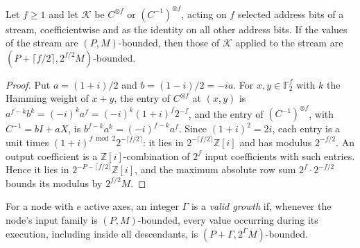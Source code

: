 \begin{lemma}\label{lem:guard-kernels}
Let $f\ge1$ and let $\mathcal K$ be $C^{\otimes f}$ or
$(C^{-1})^{\otimes f}$, acting on $f$ selected address bits of a stream,
coefficientwise and as the identity on all other address bits. If the values
of the stream are $(P,M)$-bounded, then those of $\mathcal K$ applied to the
stream are $(P+\lceil f/2\rceil,2^{f/2}M)$-bounded.
\end{lemma}
\begin{proof}
Put $a=(1+i)/2$ and $b=(1-i)/2=-ia$. For $x,y\in\mathbb F_2^f$ with $k$ the
Hamming weight of $x+y$, the entry of $C^{\otimes f}$ at $(x,y)$ is
$a^{f-k}b^k=(-i)^ka^f=(-i)^k(1+i)^f2^{-f}$, and the entry of
$(C^{-1})^{\otimes f}$, with $C^{-1}=bI+aX$, is
$b^{f-k}a^k=(-i)^{f-k}a^f$. Since $(1+i)^2=2i$, each entry is a unit times
$(1+i)^{f\bmod2}2^{-\lceil f/2\rceil}$: it lies in
$2^{-\lceil f/2\rceil}\mathbb Z[i]$ and has modulus $2^{-f/2}$. An output
coefficient is a $\mathbb Z[i]$-combination of $2^f$ input coefficients with
such entries. Hence it lies in $2^{-P-\lceil f/2\rceil}\mathbb Z[i]$, and the
maximum absolute row sum $2^f\cdot2^{-f/2}$ bounds its modulus by
$2^{f/2}M$.
\end{proof}

For a node with $e$ active axes, an integer $\Gamma$ is a \emph{valid growth}
if, whenever the node's input family is $(P,M)$-bounded, every value occurring
during its execution, including inside all descendants, is
$(P+\Gamma,2^\Gamma M)$-bounded.

